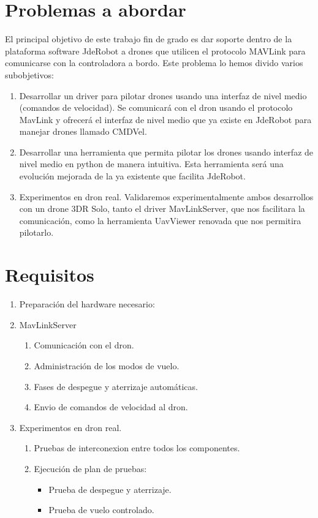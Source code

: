 \section{Problemas a abordar}

El principal objetivo de este trabajo fin de grado es dar soporte dentro de la plataforma software
JdeRobot a drones que utilicen el protocolo MAVLink para comunicarse con la controladora a bordo. Este problema lo hemos divido varios subobjetivos:

\begin{enumerate}
\item Desarrollar un driver para pilotar drones usando una interfaz de nivel medio (comandos de velocidad). Se comunicará con el dron usando el protocolo MavLink y ofrecerá el interfaz de nivel medio que ya existe en JdeRobot para manejar drones llamado CMDVel.
\item Desarrollar una herramienta que permita pilotar los drones usando interfaz de nivel medio en python de manera intuitiva. Esta herramienta será una evolución mejorada de la ya existente que facilita JdeRobot.
\item Experimentos en dron real. Validaremos experimentalmente ambos desarrollos con un drone 3DR Solo, tanto el driver MavLinkServer, que nos facilitara la comunicación, como la herramienta UavViewer renovada que nos permitira pilotarlo.
\end{enumerate}


\section{Requisitos}

\begin{enumerate}
\item Preparación del hardware necesario:
\item MavLinkServer
	\begin{enumerate}[label=\alph*]	
    \item Comunicación con el dron.
    \item Administración de los modos de vuelo.
    \item Fases de despegue y aterrizaje automáticas.
    \item Envio de comandos de velocidad al dron.
	\end{enumerate}
\item Experimentos en dron real.
	\begin{enumerate}[label=\alph*]	
    \item Pruebas de interconexion entre todos los componentes.
    \item Ejecución de plan de pruebas:
	    \begin{itemize}
    	\item Prueba de despegue y aterrizaje.
    	\item Prueba de vuelo controlado.
    	\end{itemize}
	\end{enumerate}
\end{enumerate}

